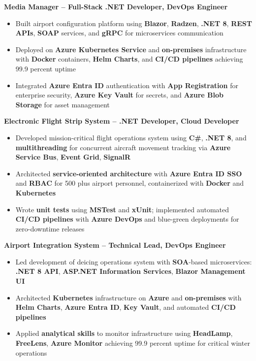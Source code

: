\documentclass[10pt,a4paper]{article}
\begin{document}
\textbf{Media Manager -- Full-Stack .NET Developer, DevOps Engineer}
\begin{itemize}
    \item Built airport configuration platform using \textbf{Blazor}, \textbf{Radzen}, \textbf{.NET 8}, \textbf{REST APIs}, \textbf{SOAP} services, and \textbf{gRPC} for microservices communication
    \item Deployed on \textbf{Azure Kubernetes Service} and \textbf{on-premises} infrastructure with \textbf{Docker} containers, \textbf{Helm Charts}, and \textbf{CI/CD pipelines} achieving 99.9 percent uptime
    \item Integrated \textbf{Azure Entra ID} authentication with \textbf{App Registration} for enterprise security, \textbf{Azure Key Vault} for secrets, and \textbf{Azure Blob Storage} for asset management
\end{itemize}

\textbf{Electronic Flight Strip System -- .NET Developer, Cloud Developer}
\begin{itemize}
    \item Developed mission-critical flight operations system using \textbf{C\#}, \textbf{.NET 8}, and \textbf{multithreading} for concurrent aircraft movement tracking via \textbf{Azure Service Bus}, \textbf{Event Grid}, \textbf{SignalR}
    \item Architected \textbf{service-oriented architecture} with \textbf{Azure Entra ID SSO} and \textbf{RBAC} for 500 plus airport personnel, containerized with \textbf{Docker} and \textbf{Kubernetes}
    \item Wrote \textbf{unit tests} using \textbf{MSTest} and \textbf{xUnit}; implemented automated \textbf{CI/CD pipelines} with \textbf{Azure DevOps} and blue-green deployments for zero-downtime releases
\end{itemize}

\textbf{Airport Integration System -- Technical Lead, DevOps Engineer}
\begin{itemize}
    \item Led development of deicing operations system with \textbf{SOA}-based microservices: \textbf{.NET 8 API}, \textbf{ASP.NET Information Services}, \textbf{Blazor Management UI}
    \item Architected \textbf{Kubernetes} infrastructure on \textbf{Azure} and \textbf{on-premises} with \textbf{Helm Charts}, \textbf{Azure Entra ID}, \textbf{Key Vault}, and automated \textbf{CI/CD pipelines}
    \item Applied \textbf{analytical skills} to monitor infrastructure using \textbf{HeadLamp}, \textbf{FreeLens}, \textbf{Azure Monitor} achieving 99.9 percent uptime for critical winter operations
\end{itemize}
\end{document}
